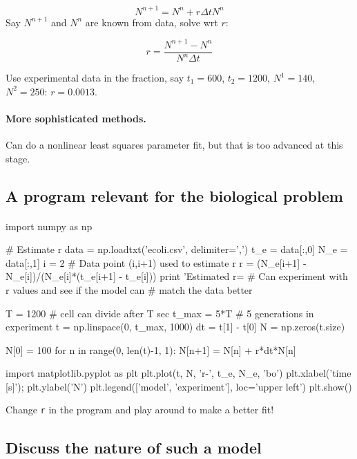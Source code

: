 \documentclass[%
twoside,                 %
final,                   %
10pt]{article}
\begin{document}
\[ N^{n+1} = N^n + r\Delta t N^n\]
Say $N^{n+1}$ and $N^n$ are known from data, solve wrt $r$:

\[ r = \frac{N^{n+1}-N^n}{N^n\Delta t} \]

Use experimental data in the fraction, say $t_1=600$, $t_2=1200$,
$N^1=140$, $N^2=250$: $r=0.0013$.




\paragraph{More sophisticated methods.}
Can do a nonlinear least squares parameter fit, but that is
too advanced at this stage.



\subsection{A program relevant for the biological problem}



\paragraph{}
\bpypro
import numpy as np

# Estimate r
data = np.loadtxt('ecoli.csv', delimiter=',')
t_e = data[:,0]
N_e = data[:,1]
i = 2  # Data point (i,i+1) used to estimate r
r = (N_e[i+1] - N_e[i])/(N_e[i]*(t_e[i+1] - t_e[i]))
print 'Estimated r=%
# Can experiment with r values and see if the model can
# match the data better

T = 1200     # cell can divide after T sec
t_max = 5*T  # 5 generations in experiment
t = np.linspace(0, t_max, 1000)
dt = t[1] - t[0]
N = np.zeros(t.size)

N[0] = 100
for n in range(0, len(t)-1, 1):
    N[n+1] = N[n] + r*dt*N[n]

import matplotlib.pyplot as plt
plt.plot(t, N, 'r-', t_e, N_e, 'bo')
plt.xlabel('time [s]');  plt.ylabel('N')
plt.legend(['model', 'experiment'], loc='upper left')
plt.show()
\epypro

Change \Verb!r! in the program and play around to make a better fit!



\subsection{Discuss the nature of such a model}
\end{document}
